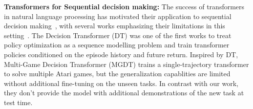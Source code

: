 \textbf{Transformers for Sequential decision making:}
The success of transformers in natural language processing \citep{transformers} has motivated their application to sequential decision making~\citep{raileanu2020fast,trajectory_transformer,reid2022can,ajay2022conditional,correia2022hierarchical,yamagata2022q,melo2022transformers,reed2022generalist,zheng2022online,chen2022transdreamer,S3M, ryoo2022token,lincontextual,sun2023smart,hu2023decision,xu2023hyper,sudhakaran2023skill}, with several works emphasizing their limitations in this setting~\citep{brandfonbrener2022does,paster2022you,siebenborn2022crucial}. The Decision Transformer (DT) \citep{decision_transformer} was one of the first works to treat policy optimization as a sequence modelling problem and train transformer policies conditioned on the episode history and future return. 
Inspired by DT, Multi-Game Decision Transformer (MGDT) \cite{MGDT} trains a single-trajectory transformer to solve multiple Atari games, but the generalization capablities are limited without additional fine-tuning on the unseen tasks. In contrast with our work, they don't provide the model with additional demonstrations of the new task at test time.
